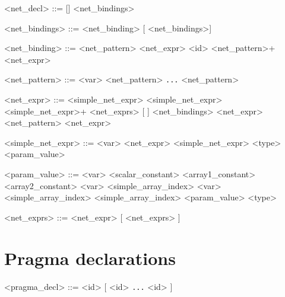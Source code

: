 \begin{grammar}
<net_decl> ::=  [] <net_bindings>

<net_bindings> ::= <net_binding> [ <net_bindings>]

<net_binding> ::= <net_pattern> \lit{=} <net_expr>              %
                \alt <id> <net_pattern>+ \lit{=} <net_expr>    %

<net_pattern> ::= <var>
                \alt \lit{(} <net_pattern> \lit{,} \texttt{...} \lit{,} <net_pattern> \lit{)}

             
<net_expr> ::=
   <simple_net_expr>
 \alt <simple_net_expr> <simple_net_expr>+                   %
 \alt <net_exprs>                                            %
 \alt {} [  ] <net_bindings>  <net_expr>         %
 \alt {} <net_pattern> \lit{\texttt{->}} <net_expr>               %

<simple_net_expr> ::=
    <var>                                     %
  \alt \lit{(} <net_expr> \lit{)}
  \alt \lit{(} <simple_net_expr> \lit{:} <type> \lit{)}
  \alt <param_value>

<param_value> ::=
    <var> 
  \alt <scalar_constant>
  \alt <array1_constant>                         
  \alt <array2_constant>                         
  \alt \lit{(} <var> \lit{[} <simple_array_index> \lit{]} \lit{)}
  \alt \lit{(} <var> \lit{[} <simple_array_index> \lit{]} \lit{[} <simple_array_index> \lit{]} \lit{)}
  \alt \lit{(} <param_value> \lit{:} <type> \lit{)}

<net_exprs> ::= <net_expr> [ \lit{,} <net_exprs> ]
\end{grammar}

\section*{Pragma  declarations}

\begin{grammar}
<pragma_decl> ::=  <id> [ \lit{(} <id> \lit{,} \texttt{...} \lit{,} <id> \lit{)} ]
\end{grammar}

